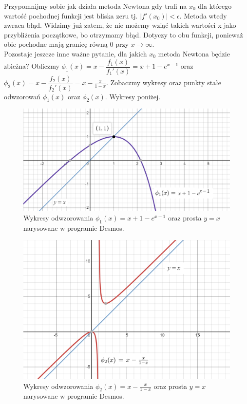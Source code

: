 \documentclass[]{article}
\begin{document}
	Przypomnijmy sobie jak działa metoda Newtona gdy trafi na $x_0$ dla którego wartość pochodnej funkcji jest bliska zeru tj. $|f'(x_0)|<\epsilon$. Metoda wtedy zwraca błąd. Widzimy już zatem, że nie możemy wziąć takich wartości x jako przybliżenia początkowe, bo otrzymamy błąd. Dotyczy to obu funkcji, ponieważ obie pochodne mają granicę równą 0 przy $x\to\infty$.\\
	Pozostaje jeszcze inne ważne pytanie, dla jakich $x_0$ metoda Newtona będzie zbieżna? Obliczmy $\phi_1(x) = x - \dfrac{f_1(x)}{f_1'(x)} = x+1-e^{x-1}$ oraz 
	 $\phi_2(x) = x - \dfrac{f_2(x)}{f_2'(x)} = x-\frac{x}{1-x}$. Zobaczmy wykresy oraz punkty stałe odwzorowań $\phi_1(x)$ oraz $\phi_2(x)$. Wykresy poniżej.
	\begin{figure}[!htbp]
		\includegraphics[width=\textwidth]{task6f1phi}
		\centering
		\caption{Wykresy odwzorowania $\phi_1(x) = x+1-e^{x-1}$ oraz prosta $y=x$ narysowane w programie Desmos.}
	\end{figure}
	\begin{figure}[!htbp]
	\includegraphics[height=0.40\textheight]{task6f2phi}
	\centering
	\caption{Wykresy odwzorowania $\phi_2(x) = x-\frac{x}{1-x}$ oraz prosta $y=x$ narysowane w programie Desmos.}
	\end{figure}
	
\end{document}
